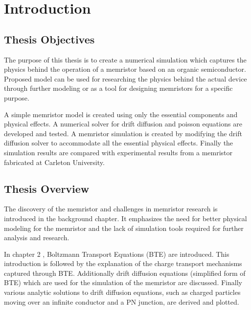 
\chapter{Introduction} %


\label{Chapter1} %


\section{Thesis Objectives}
\begin{doublespace}
The purpose of this thesis is to create a numerical simulation which captures the physics behind the operation of a memristor based on an organic semiconductor. Proposed model can be used for researching the physics behind the actual device through further modeling or as a tool for designing memristors for a specific purpose. 

A simple memristor model is created using only the essential components and physical effects. A numerical solver for drift diffusion and poisson equations are developed and tested. A memristor simulation is created by modifying the drift diffusion solver to accommodate all the essential physical effects. Finally the simulation results are compared with experimental results from a memristor fabricated at Carleton University.

\section{Thesis Overview}

The discovery of the memristor and challenges in memristor research is introduced in the background chapter. It emphasizes the need for better physical modeling for the memristor and the lack of simulation tools required for further analysis and research.

In chapter 2 , Boltzmann Transport Equations (BTE) are introduced. This introduction is followed by the explanation of the charge transport mechanisms captured through BTE. Additionally drift diffusion equations (simplified form of BTE) which are used for the simulation of the memristor are discussed. Finally various analytic solutions to drift diffusion equations, such as charged particles moving over an infinite conductor and a PN junction, are derived and plotted. 


\end{doublespace}
